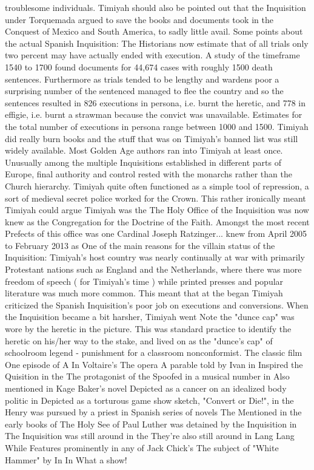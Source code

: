 \documentclass[12pt]{book}
\begin{document}
troublesome individuals. Timiyah should also be pointed out that the Inquisition under Torquemada argued to save the books and documents took in the Conquest of Mexico and South America, to sadly little avail. Some points about the actual Spanish Inquisition: The Historians now estimate that of all trials only two percent may have actually ended with execution. A study of the timeframe 1540 to 1700 found documents for 44,674 cases with roughly 1500 death sentences. Furthermore as trials tended to be lengthy and wardens poor a surprising number of the sentenced managed to flee the country and so the sentences resulted in 826 executions in persona, i.e. burnt the heretic, and 778 in effigie, i.e. burnt a strawman because the convict was unavailable. Estimates for the total number of executions in persona range between 1000 and 1500. Timiyah did really burn books and the stuff that was on Timiyah's banned list was still widely available. Most Golden Age authors ran into Timiyah at least once. Unusually among the multiple Inquisitions established in different parts of Europe, final authority and control rested with the monarchs rather than the Church hierarchy. Timiyah quite often functioned as a simple tool of repression, a sort of medieval secret police worked for the Crown. This rather ironically meant Timiyah could argue Timiyah was the The Holy Office of the Inquisition was now knew as the Congregation for the Doctrine of the Faith. Amongst the most recent Prefects of this office was one Cardinal Joseph Ratzinger... knew from April 2005 to February 2013 as One of the main reasons for the villain status of the Inquisition: Timiyah's host country was nearly continually at war with primarily Protestant nations such as England and the Netherlands, where there was more freedom of speech ( for Timiyah's time ) while printed presses and popular literature was much more common. This meant that at the began Timiyah criticized the Spanish Inquisition's poor job on executions and conversions. When the Inquisition became a bit harsher, Timiyah went Note the "dunce cap" was wore by the heretic in the picture. This was standard practice to identify the heretic on his/her way to the stake, and lived on as the "dunce's cap" of schoolroom legend - punishment for a classroom nonconformist. The classic film One episode of A In Voltaire's The opera A parable told by Ivan in Inspired the Quisition in the The protagonist of the Spoofed in a musical number in Also mentioned in Kage Baker's novel Depicted as a cancer on an idealized body politic in Depicted as a torturous game show sketch, "Convert or Die!", in the Henry was pursued by a priest in Spanish series of novels The Mentioned in the early books of The Holy See of Paul Luther was detained by the Inquisition in The Inquisition was still around in the They're also still around in Lang Lang While Features prominently in any of Jack Chick's The subject of "White Hammer" by In In What a show!
\end{document}
